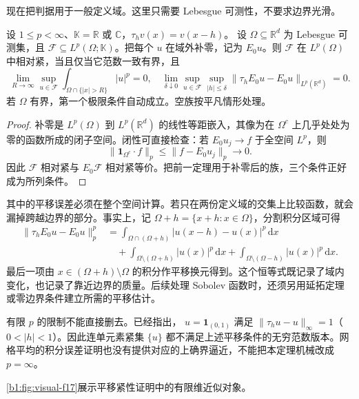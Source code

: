 \ProseParagraphBreak

现在把判据用于一般定义域。这里只需要 Lebesgue 可测性，不要求边界光滑。

\begin{corollary}\label{b1:cor:lp-domain-zero-extension-compactness}
设 \(1\leq p<\infty\)、\(\mathbb K=\mathbb R\) 或 \(\mathbb C\)，\(\tau_hv(x)=v(x-h)\)。
设 \(\Omega\subseteq\mathbb R^d\) 为 Lebesgue 可测集，且
\(\mathcal F\subseteq L^p(\Omega;\mathbb K)\)。把每个 \(u\) 在域外补零，记为 \(E_0u\)。则 \(\mathcal F\) 在 \(L^p(\Omega)\) 中相对紧，当且仅当它范数一致有界，且
\[
 \lim_{R\to\infty}\sup_{u\in\mathcal F}
      \int_{\Omega\cap\{|x|>R\}}|u|^p=0,\quad
 \lim_{\delta\downarrow0}\sup_{u\in\mathcal F}
      \sup_{|h|\leq\delta}\|\tau_hE_0u-E_0u\|_{L^p(\mathbb R^d)}=0.
\]
若 \(\Omega\) 有界，第一个极限条件自动成立。空族按平凡情形处理。
\end{corollary}
\begin{proof}
补零是 \(L^p(\Omega)\) 到 \(L^p(\mathbb R^d)\) 的线性等距嵌入，其像为在 \(\Omega^c\) 上几乎处处为零的函数所成的闭子空间。闭性可直接检查：若 \(E_0u_j\to f\) 于全空间 \(L^p\)，则
\[
 \|\mathbf1_{\Omega^c}\cdot f\|_p
 \leq\|f-E_0u_j\|_p\longrightarrow0.
\]
因此 \(\mathcal F\) 相对紧与 \(E_0\mathcal F\) 相对紧等价。把前一定理用于补零后的族，三个条件正好成为所列条件。
\end{proof}

其中的平移误差必须在整个空间计算。若只在两份定义域的交集上比较函数，就会漏掉跨越边界的部分。事实上，记
\(\Omega+h=\{x+h:x\in\Omega\}\)，分割积分区域可得
\[
 \begin{aligned}
 \|\tau_hE_0u-E_0u\|_p^p
 &=\int_{\Omega\cap(\Omega+h)}
         |u(x-h)-u(x)|^p\,\mathrm dx\\
 &\quad+\int_{\Omega\setminus(\Omega+h)}|u(x)|^p\,\mathrm dx
       +\int_{\Omega\setminus(\Omega-h)}|u(x)|^p\,\mathrm dx.
 \end{aligned}
\]
最后一项由 \(x\in(\Omega+h)\setminus\Omega\) 的积分作平移换元得到。这个恒等式既记录了域内变化，也记录了靠近边界的质量。后续处理 Sobolev 函数时，还须另用延拓定理或零边界条件建立所需的平移估计。

\ProseParagraphBreak

有限 \(p\) 的限制不能直接删去。已经指出，
\(u=\mathbf1_{(0,1)}\) 满足
\(\|\tau_hu-u\|_\infty=1\)（\(0<|h|<1\)）。因此连单元素紧集
\(\{u\}\) 都不满足上述平移条件的无穷范数版本。网格平均的积分误差证明也没有提供对应的上确界逼近，不能把本定理机械改成 \(p=\infty\)。

\cref{b1:fig:visual-f17}展示平移紧性证明中的有限维近似对象。

